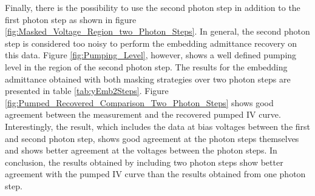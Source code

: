 \documentclass[]{article}
\begin{document}
Finally, there is the possibility to use the second photon step in addition to the first photon step as shown in figure \ref{fig:Masked_Voltage_Region_two_Photon_Steps}. In general, the second photon step is considered too noisy to perform the embedding admittance recovery on this data. Figure \ref{fig:Pumping_Level}, however, shows a well defined pumping level in the region of the second photon step. The results for the embedding admittance obtained with both masking strategies over two photon steps are presented in table \ref{tab:yEmb2Steps}. Figure \ref{fig:Pumped_Recovered_Comparison_Two_Photon_Steps} shows good agreement between the measurement and the recovered pumped IV curve. Interestingly, the result, which includes the data at bias voltages between the first and second photon step, shows good agreement at the photon steps themselves and shows better agreement at the voltages between the photon steps. In conclusion, the results obtained by including two photon steps show better agreement with the pumped IV curve than the results obtained from one photon step.
\end{document}
